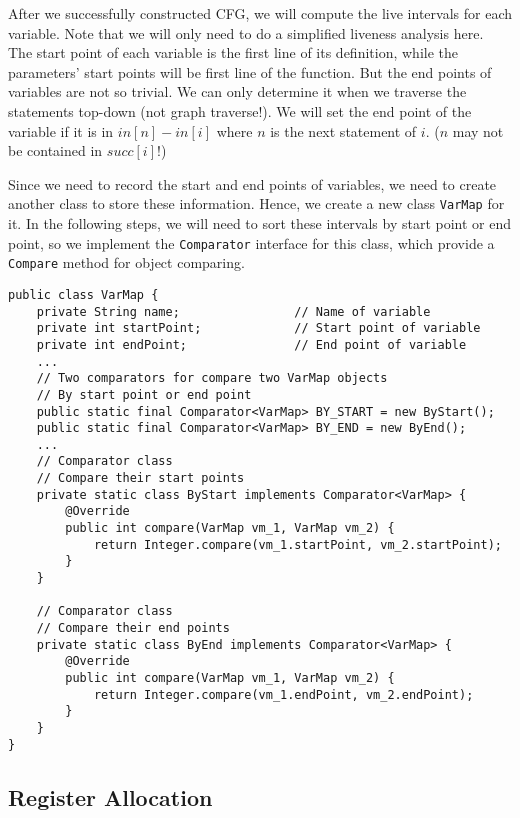 \documentclass[letterpaper, 14pt]{article}
\begin{document}
After we successfully constructed CFG, we will compute the live intervals for each variable. Note that we will only need to do a simplified liveness analysis here. The start point of each variable is the first line of its definition, while the parameters' start points will be first line of the function. But the end points of variables are not so trivial. We can only determine it when we traverse the statements top-down (not graph traverse!). We will set the end point of the variable if it is in $in[n]-in[i]$ where $n$ is the next statement of $i$. ($n$ may not be contained in $succ[i]$!)

Since we need to record the start and end points of variables, we need to create another class to store these information. Hence, we create a new class \texttt{VarMap} for it. In the following steps, we will need to sort these intervals by start point or end point, so we implement the \texttt{Comparator} interface for this class, which provide a \texttt{Compare} method for object comparing. 
\begin{lstlisting}
public class VarMap {
	private String name;				// Name of variable
	private int startPoint;				// Start point of variable
	private int endPoint;				// End point of variable
	...
	// Two comparators for compare two VarMap objects
	// By start point or end point
	public static final Comparator<VarMap> BY_START = new ByStart();
	public static final Comparator<VarMap> BY_END = new ByEnd();
	...
	// Comparator class
	// Compare their start points
	private static class ByStart implements Comparator<VarMap> {
		@Override
		public int compare(VarMap vm_1, VarMap vm_2) {
			return Integer.compare(vm_1.startPoint, vm_2.startPoint);
		}
	}
	
	// Comparator class
	// Compare their end points
	private static class ByEnd implements Comparator<VarMap> {
		@Override
		public int compare(VarMap vm_1, VarMap vm_2) {
			return Integer.compare(vm_1.endPoint, vm_2.endPoint);
		}
	}
}
\end{lstlisting}

\subsection{Register Allocation}
\end{document}
